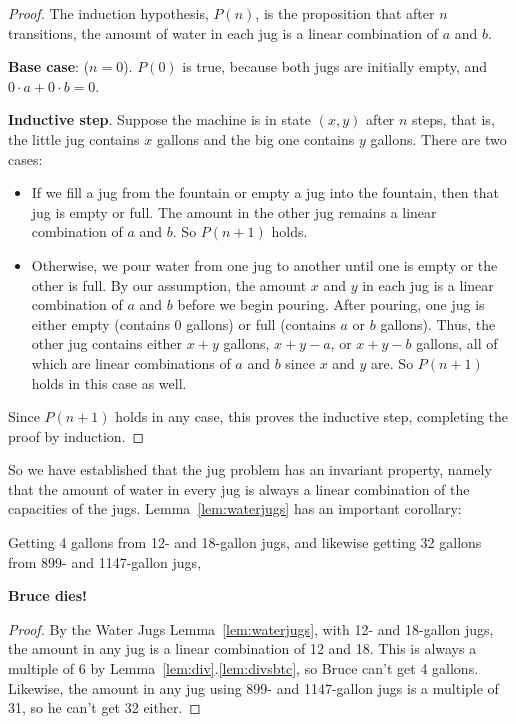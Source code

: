 \begin{proof}
The induction hypothesis, $P(n)$, is the proposition that after $n$
transitions, the amount of water in each jug is a linear combination
of $a$ and $b$.

\noindent \textbf{Base case}: ($n = 0$).  $P(0)$ is true, because both jugs are
initially empty, and $0 \cdot a + 0 \cdot b = 0$.

\noindent \textbf{Inductive step}.  Suppose the machine is in state
$(x,y)$ after $n$ steps, that is, the little jug contains $x$ gallons
and the big one contains $y$ gallons.
There are two cases:

\begin{itemize}

\item If we fill a jug from the fountain or empty a jug into the
fountain, then that jug is empty or full.  The amount in the other jug
remains a linear combination of $a$ and $b$.  So $P(n+1)$ holds.

\item Otherwise, we pour water from one jug to another until one is
  empty or the other is full.  By our assumption, the amount $x$ and
  $y$ in each jug is a linear combination of $a$ and $b$ before we
  begin pouring.  After pouring, one jug is either empty (contains 0
  gallons) or full (contains $a$ or $b$ gallons).  Thus, the other jug
  contains either $x + y$ gallons, $x + y - a$, or $x + y - b$
  gallons, all of which are linear combinations of $a$ and $b$ since
  $x$ and $y$ are.  So $P(n+1)$ holds in this case as well.
\end{itemize}
Since $P(n+1)$ holds in any case, this proves the inductive step,
completing the proof by induction.
\end{proof}

So we have established that the jug problem has an invariant property,
namely that the amount of water in every jug is always a linear
combination of the capacities of the jugs.
Lemma~\ref{lem:waterjugs} has an important corollary:
\begin{corollary*}
Getting 4 gallons from 12- and 18-gallon jugs, and likewise
getting 32 gallons from 899- and 1147-gallon jugs,
\begin{center}
\textbf{Bruce dies!}
\end{center}
\end{corollary*}

\begin{proof}
By the Water Jugs Lemma~\ref{lem:waterjugs}, with 12- and 18-gallon
jugs, the amount in any jug is a linear combination of 12 and 18.
This is always a multiple of 6 by
Lemma~\ref{lem:div}.\ref{lem:divsbtc}, so Bruce can't get 4 gallons.
Likewise, the amount in any jug using 899- and 1147-gallon jugs is a
multiple of 31, so he can't get 32 either.
\end{proof}

